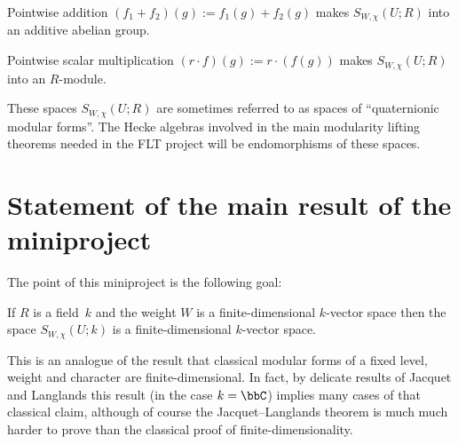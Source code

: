 \begin{definition}
  \label{TotallyDefiniteQuaternionAlgebra.AutomorphicForm.addCommGroup}
  \leanok
  Pointwise addition $(f_1+f_2)(g):=f_1(g)+f_2(g)$ makes $S_{W,\chi}(U;R)$ into an additive
  abelian group.
\end{definition}

\begin{definition}
  \label{TotallyDefiniteQuaternionAlgebra.AutomorphicForm.module}
  \leanok
  Pointwise scalar multiplication $(r\cdot f)(g):= r\cdot(f(g))$ makes
  $S_{W,\chi}(U;R)$ into an $R$-module.
\end{definition}

These spaces $S_{W,\chi}(U;R)$ are sometimes referred to as spaces of ``quaternionic modular forms''.
The Hecke algebras involved in the main modularity lifting theorems needed in the FLT project
will be endomorphisms of these spaces.

\section{Statement of the main result of the miniproject}

The point of this miniproject is the following goal:

\begin{theorem}
  \label{TotallyDefiniteQuaternionAlgebra.AutomorphicForm.finiteDimensional}
  If $R$ is a field~$k$ and the weight $W$ is a finite-dimensional $k$-vector space
  then the space $S_{W,\chi}(U;k)$ is a finite-dimensional $k$-vector space.
\end{theorem}

This is an analogue of the result that classical modular forms of a fixed
level, weight and character are finite-dimensional. In fact, by delicate results
of Jacquet and Langlands this result (in the case $k=\bbC$) implies many cases of that classical claim,
although of course the Jacquet--Langlands theorem is much much harder to prove than the classical
proof of finite-dimensionality.

